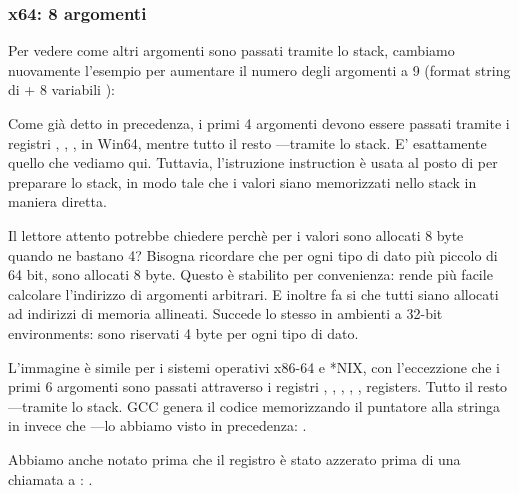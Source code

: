 \subsubsection{x64: 8 argomenti}

\label{example_printf8_x64}
Per vedere come altri argomenti sono passati tramite lo stack, cambiamo nuovamente l'esempio per aumentare il numero degli argomenti a 9 (format string di \printf + 8 variabili \Tint):




Come già detto in precedenza, i primi 4 argomenti devono essere passati tramite i registri \RCX, \RDX, ,  in Win64,
mentre tutto il resto ---tramite lo stack.
E' esattamente quello che vediamo qui.
Tuttavia, l'istruzione \MOV instruction è usata al posto di \PUSH per preparare lo stack, in modo tale che i valori siano memorizzati
nello stack in maniera diretta.



Il lettore attento potrebbe chiedere perchè per i valori \Tint sono allocati 8 byte quando ne bastano 4?
Bisogna ricordare che per ogni tipo di dato più piccolo di 64 bit, sono allocati 8 byte.
Questo è stabilito per convenienza: rende più facile calcolare l'indirizzo di argomenti arbitrari. E inoltre fa si che tutti
siano allocati ad indirizzi di memoria allineati.
Succede lo stesso in ambienti a 32-bit environments: sono riservati 4 byte per ogni tipo di dato.



L'immagine è simile per i sistemi operativi x86-64 e *NIX, con l'eccezzione che i primi 6 argomenti sono passati attraverso
i registri \RDI, \RSI, \RDX, \RCX, ,  registers.
Tutto il resto ---tramite lo stack.
GCC genera il codice memorizzando il puntatore alla stringa in \EDI invece che \RDI{}---lo abbiamo visto in precedenza: 
.

Abbiamo anche notato prima che il registro \EAX è stato azzerato prima di una chiamata a \printf: .

